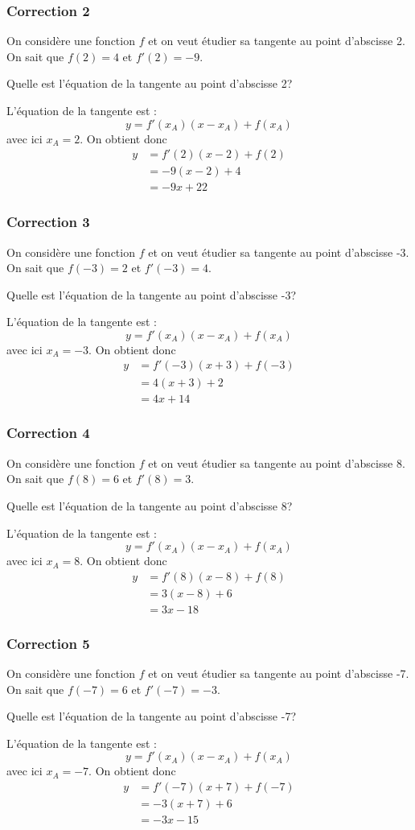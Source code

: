 \documentclass[15pt, mathserif]{beamer}
\begin{document}
\begin{frame}
\vspace{-10mm}
	\frametitle{Correction 2}
On considère une fonction $f$ et on veut étudier sa tangente au point d'abscisse 2. On sait que $f(2)=4$ et $f'(2)=-9$. 
 
  Quelle est l'équation de la tangente au point d'abscisse 2? 
 
 L'équation de la tangente est : $$y=f'(x_A)(x-x_A) + f(x_A)$$ avec ici $x_A=2$. On obtient donc 
 \begin{align*} 
 y&= f'(2)(x-2)+f(2) \\ 
 &=-9(x-2)+4\\ 
 &= -9x+22
 \end{align*}\end{frame}


\begin{frame}
\vspace{-10mm}
	\frametitle{Correction 3}
On considère une fonction $f$ et on veut étudier sa tangente au point d'abscisse -3. On sait que $f(-3)=2$ et $f'(-3)=4$. 
 
  Quelle est l'équation de la tangente au point d'abscisse -3? 
 
 L'équation de la tangente est : $$y=f'(x_A)(x-x_A) + f(x_A)$$ avec ici $x_A=-3$. On obtient donc 
 \begin{align*} 
 y&= f'(-3)(x+3)+f(-3) \\ 
 &=4(x+3)+2\\ 
 &= 4x+14
 \end{align*}\end{frame}


\begin{frame}
\vspace{-10mm}
	\frametitle{Correction 4}
On considère une fonction $f$ et on veut étudier sa tangente au point d'abscisse 8. On sait que $f(8)=6$ et $f'(8)=3$. 
 
  Quelle est l'équation de la tangente au point d'abscisse 8? 
 
 L'équation de la tangente est : $$y=f'(x_A)(x-x_A) + f(x_A)$$ avec ici $x_A=8$. On obtient donc 
 \begin{align*} 
 y&= f'(8)(x-8)+f(8) \\ 
 &=3(x-8)+6\\ 
 &= 3x-18
 \end{align*}\end{frame}


\begin{frame}
\vspace{-10mm}
	\frametitle{Correction 5}
On considère une fonction $f$ et on veut étudier sa tangente au point d'abscisse -7. On sait que $f(-7)=6$ et $f'(-7)=-3$. 
 
  Quelle est l'équation de la tangente au point d'abscisse -7? 
 
 L'équation de la tangente est : $$y=f'(x_A)(x-x_A) + f(x_A)$$ avec ici $x_A=-7$. On obtient donc 
 \begin{align*} 
 y&= f'(-7)(x+7)+f(-7) \\ 
 &=-3(x+7)+6\\ 
 &= -3x-15
 \end{align*}\end{frame}
\end{document}
